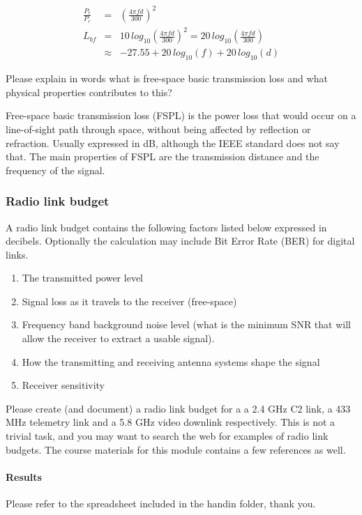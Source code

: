 \documentclass[paper=letter, fontsize=10pt]{article}
\begin{document}
\begin{eqnarray}
\frac{P_t}{P_r} &=& \left(\frac{4 \pi f d}{300}\right)^2 \\
L_{bf} &=& 10 \, log_{10}\left(\frac{4 \pi f d}{300}\right)^2 = 20 \, log_{10}\left(\frac{4 \pi f d}{300}\right) \\
&\approx& -27.55 + 20 \, log_{10} (f) + 20 \, log_{10}\left(d\right)
\label{eq:freespaceloss}
\end{eqnarray}

Please explain in words what is free-space basic transmission loss and what physical properties contributes to this?


Free-space basic transmission loss (FSPL) is the power loss that would occur on a line-of-sight path through space, without being affected by reflection or refraction. Usually expressed in dB, although the IEEE standard does not say that.\cite{wiki} The main properties of FSPL are the transmission distance and the frequency of the signal. 


\subsubsection{Radio link budget}
A radio link budget contains the following factors listed below expressed in decibels. Optionally the calculation may include Bit Error Rate (BER) for digital links.

\begin{enumerate}
	\item The transmitted power level
	\item Signal loss as it travels to the receiver (free-space)
	\item Frequency band background noise level (what is the minimum SNR that will allow the receiver to extract a usable signal).
	\item How the transmitting and receiving antenna systems shape the signal
	\item Receiver sensitivity
\end{enumerate}


Please create (and document) a radio link budget for a a 2.4 GHz C2 link, a 433 MHz telemetry link and a 5.8 GHz video downlink respectively. This is not a trivial task, and you may want to search the web for examples of radio link budgets. The course materials for this module contains a few references as well.

\paragraph{Results} Please refer to the spreadsheet included in the hand\-in folder, thank you. 
\end{document}
